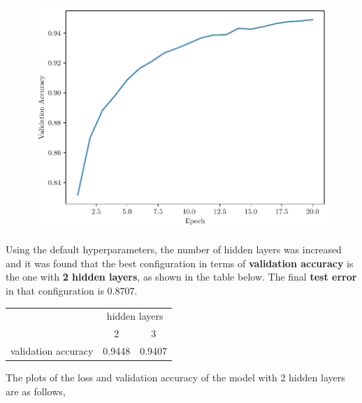 \begin{questions}
        \begin{figure}[H]
            \centering
            \includegraphics[scale = 0.75]{feedforward-validation-accuracy-0.01-200-1-0.3-relu-sgd-16.pdf}
        \end{figure}
        \question %

        Using the default hyperparameters, the number of hidden layers was increased
        and it was found that the best configuration in terms of \textbf{validation accuracy} is the one with \textbf{2 hidden layers},
        as shown in the table below. The final \textbf{test error} in that configuration is 0.8707.

        \begin{table}[h!]
            \centering
            \begin{tabular}{l|cc}
                 & \multicolumn{2}{c}{hidden layers}     \\ \cline{2-3} 
                 & \multicolumn{1}{c|}{2}      & 3       \\ \hline
                    \multicolumn{1}{c|}{validation accuracy} & \multicolumn{1}{c|}{0.9448} & 0.9407
            \end{tabular}
        \end{table}

        The plots of the loss and validation accuracy of the model with 2 hidden layers are as follows,


\end{questions}
